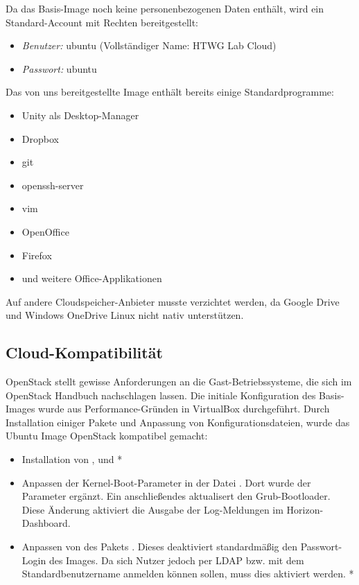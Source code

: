 Da das Basis-Image noch keine personenbezogenen Daten enthält, wird ein Standard-Account mit  Rechten bereitgestellt:

\begin{itemize}
\item \emph{Benutzer:} ubuntu (Vollständiger Name: HTWG Lab Cloud)
\item \emph{Passwort:} ubuntu
\end{itemize}

Das von uns bereitgestellte Image enthält bereits einige Standardprogramme:

\begin{itemize}
\item Unity als Desktop-Manager
\item Dropbox
\item git
\item openssh-server
\item vim
\item OpenOffice
\item Firefox
\item und weitere Office-Applikationen
\end{itemize}

Auf andere Cloudspeicher-Anbieter musste verzichtet werden, da Google Drive und Windows OneDrive Linux nicht nativ unterstützen.

\subsection{Cloud-Kompatibilität}

OpenStack stellt gewisse Anforderungen an die Gast-Betriebssysteme, die sich im OpenStack Handbuch \cite{osImageRequirement} nachschlagen lassen. 
Die initiale Konfiguration des Basis-Images wurde aus Performance-Gründen in VirtualBox durchgeführt.
Durch Installation einiger Pakete und Anpassung von Konfigurationsdateien, wurde das Ubuntu Image OpenStack kompatibel gemacht:

\begin{itemize}
\item Installation von ,  und  *
\item Anpassen der Kernel-Boot-Parameter in der Datei . Dort wurde der Parameter  ergänzt. Ein anschließendes  aktualisert den Grub-Bootloader. Diese Änderung aktiviert die Ausgabe der Log-Meldungen im Horizon-Dashboard.
\item Anpassen von  des Pakets . Dieses deaktiviert standardmäßig den Passwort-Login des Images. Da sich Nutzer jedoch per LDAP bzw. mit dem Standardbenutzername anmelden können sollen, muss dies aktiviert werden. *
\end{itemize}

